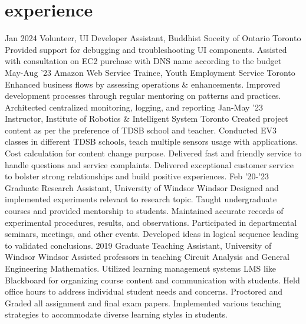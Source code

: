\documentclass[]{twentysecondcv}
\begin{document}
\section{experience}
\begin{twenty}
  \twentyitem
    {Jan 2024}
    {Volunteer, UI Developer Assistant, Buddhist Soceity of Ontario}
    {Toronto}
    { Provided support for debugging and troubleshooting UI components. 
      Assisted with consultation on EC2 purchase with DNS name according to the budget }
  \twentyitem
    {May-Aug '23}
    {Amazon Web Service Trainee, Youth Employment Service}
    {Toronto}
    {Enhanced business flows by assessing operations $\&$ enhancements. 
    Improved development processes through regular mentoring on patterns and practices. 
    Architected centralized monitoring, logging, and reporting}
  \twentyitem
    {Jan-May '23}
    {Instructor, Institute of Robotics $\&$ Intelligent System}
    {Toronto}
    {Created project content as per the preference of TDSB school and teacher.
    Conducted EV3 classes in different TDSB schools, teach multiple sensors usage with applications.
    Cost calculation for content change purpose.
    Delivered fast and friendly service to handle questions and service complaints.
    Delivered exceptional customer service to bolster strong relationships and build positive experiences.}
    \twentyitem
    {Feb '20-'23} 
    {Graduate Research Assistant, University of Windsor}
    {Windsor}
    {Designed and implemented experiments relevant to research topic.
    Taught undergraduate courses and provided mentorship to students.
    Maintained accurate records of experimental procedures, results, and observations.
    Participated in departmental seminars, meetings, and other events.
    Developed ideas in logical sequence leading to validated conclusions.}
    \twentyitem
    {2019}
    {Graduate Teaching Assistant,  University of Windsor}
    {Windsor}
    {Assisted professors in teaching Circuit Analysis and General Engineering Mathematics.
    Utilized learning management systems LMS like Blackboard for organizing course content and communication with students.
    Held office hours to address individual student needs and concerns. Proctored and Graded all assignment and final exam papers.
    Implemented various teaching strategies to accommodate diverse learning styles in students.}

  \end{twenty}
\end{document}
